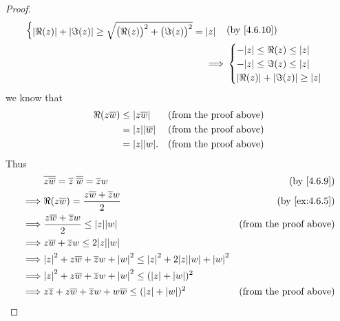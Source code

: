 \begin{proof}
\begin{align*}
\begin{cases}
                 \abs{\Re(z)} + \abs{\Im(z)} \geq \sqrt{\big(\Re(z)\big)^2 + \big(\Im(z)\big)^2} = \abs{z}
               \end{cases}                                                    & \text{(by \cref{4.6.10})}                                                  \\
    \implies & \begin{cases}
                 -\abs{z} \leq \Re(z) \leq \abs{z} \\
                 -\abs{z} \leq \Im(z) \leq \abs{z} \\
                 \abs{\Re(z)} + \abs{\Im(z)} \geq \abs{z}
               \end{cases}
  \end{align*}
  we know that
  \begin{align*}
    \Re(z \overline{w}) & \leq \abs{z \overline{w}}    & \text{(from the proof above)} \\
                        & = \abs{z} \abs{\overline{w}} & \text{(from the proof above)} \\
                        & = \abs{z} \abs{w}.           & \text{(from the proof above)}
  \end{align*}
  Thus
  \begin{align*}
             & \overline{z \overline{w}} = \overline{z} \; \overline{\overline{w}} = \overline{z} w                   & \text{(by \cref{4.6.9})}               \\
    \implies & \Re(z \overline{w}) = \frac{z \overline{w} + \overline{z} w}{2}                                        & \text{(by \cref{ex:4.6.5})}            \\
    \implies & \frac{z \overline{w} + \overline{z} w}{2} \leq \abs{z} \abs{w}                                         & \text{(from the proof above)}          \\
    \implies & z \overline{w} + \overline{z} w \leq 2 \abs{z} \abs{w}                                                                                          \\
    \implies & \abs{z}^2 + z \overline{w} + \overline{z} w + \abs{w}^2 \leq \abs{z}^2 + 2 \abs{z} \abs{w} + \abs{w}^2                                          \\
    \implies & \abs{z}^2 + z \overline{w} + \overline{z} w + \abs{w}^2 \leq (\abs{z} + \abs{w})^2                                                              \\
    \implies & z \overline{z} + z \overline{w} + \overline{z} w + w \overline{w} \leq (\abs{z} + \abs{w})^2           & \text{(from the proof above)}          \\

\end{align*}
\end{proof}
